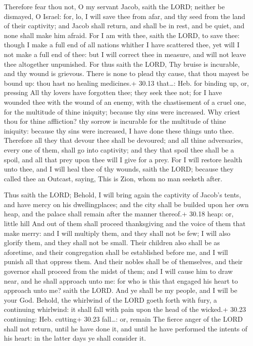  Therefore fear thou not, O my servant Jacob, saith the
LORD; neither be dismayed, O Israel: for, lo, I will save thee from
afar, and thy seed from the land of their captivity; and Jacob shall
return, and shall be in rest, and be quiet, and none shall make him
afraid.  For I am with thee, saith the LORD, to save thee:
though I make a full end of all nations whither I have scattered thee,
yet will I not make a full end of thee: but I will correct thee in
measure, and will not leave thee altogether unpunished. 
For thus saith the LORD, Thy bruise is incurable, and thy wound is
grievous.  There is none to plead thy cause, that thou
mayest be bound up: thou hast no healing medicines.+ 30.13 that\ldots:
Heb. for binding up, or, pressing  All thy lovers have
forgotten thee; they seek thee not; for I have wounded thee with the
wound of an enemy, with the chastisement of a cruel one, for the
multitude of thine iniquity; because thy sins were increased.
 Why criest thou for thine affliction? thy sorrow is
incurable for the multitude of thine iniquity: because thy sins were
increased, I have done these things unto thee.  Therefore
all they that devour thee shall be devoured; and all thine adversaries,
every one of them, shall go into captivity; and they that spoil thee
shall be a spoil, and all that prey upon thee will I give for a prey.
 For I will restore health unto thee, and I will heal thee
of thy wounds, saith the LORD; because they called thee an Outcast,
saying, This is Zion, whom no man seeketh after.

 Thus saith the LORD; Behold, I will bring again the
captivity of Jacob's tents, and have mercy on his dwellingplaces; and
the city shall be builded upon her own heap, and the palace shall remain
after the manner thereof.+ 30.18 heap: or, little hill  And
out of them shall proceed thanksgiving and the voice of them that make
merry: and I will multiply them, and they shall not be few; I will also
glorify them, and they shall not be small.  Their children
also shall be as aforetime, and their congregation shall be established
before me, and I will punish all that oppress them.  And
their nobles shall be of themselves, and their governor shall proceed
from the midst of them; and I will cause him to draw near, and he shall
approach unto me: for who is this that engaged his heart to approach
unto me? saith the LORD.  And ye shall be my people, and I
will be your God.  Behold, the whirlwind of the LORD goeth
forth with fury, a continuing whirlwind: it shall fall with pain upon
the head of the wicked.+ 30.23 continuing: Heb. cutting+ 30.23
fall\ldots: or, remain  The fierce anger of the LORD shall
not return, until he have done it, and until he have performed the
intents of his heart: in the latter days ye shall consider it.

